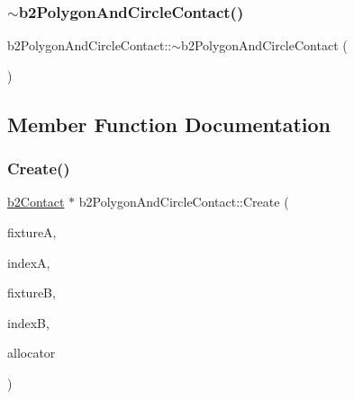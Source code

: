 \mbox{\label{classb2_polygon_and_circle_contact_abe6539183d4904194418809915b20490}} 
\subsubsection{\texorpdfstring{$\sim$b2PolygonAndCircleContact()}{~b2PolygonAndCircleContact()}}
{\footnotesize\ttfamily b2\+Polygon\+And\+Circle\+Contact\+::$\sim$b2\+Polygon\+And\+Circle\+Contact (\begin{DoxyParamCaption}{ }\end{DoxyParamCaption})\hspace{0.3cm}{\ttfamily [inline]}}



\subsection{Member Function Documentation}
\mbox{\label{classb2_polygon_and_circle_contact_a0b83e092a7d14f9cdd919fa15ef6058f}} 
\subsubsection{\texorpdfstring{Create()}{Create()}}
{\footnotesize\ttfamily \mbox{\hyperlink{classb2_contact}{b2\+Contact}} $\ast$ b2\+Polygon\+And\+Circle\+Contact\+::\+Create (\begin{DoxyParamCaption}\item[{\mbox{\hyperlink{classb2_fixture}{b2\+Fixture}} $\ast$}]{fixtureA,  }\item[{\mbox{\hyperlink{b2_settings_8h_a43d43196463bde49cb067f5c20ab8481}{int32}}}]{indexA,  }\item[{\mbox{\hyperlink{classb2_fixture}{b2\+Fixture}} $\ast$}]{fixtureB,  }\item[{\mbox{\hyperlink{b2_settings_8h_a43d43196463bde49cb067f5c20ab8481}{int32}}}]{indexB,  }\item[{\mbox{\hyperlink{classb2_block_allocator}{b2\+Block\+Allocator}} $\ast$}]{allocator }\end{DoxyParamCaption})\hspace{0.3cm}{\ttfamily [static]}}

